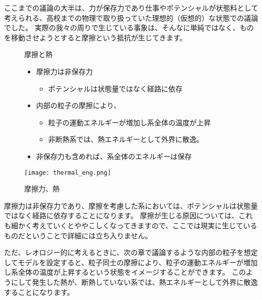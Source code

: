 \documentclass[uplatex,dvipdfmx,a4paper,11pt]{jsarticle}
\begin{document}
ここまでの議論の大半は、力が保存力であり仕事やポテンシャルが状態料として考えられる、高校までの物理で取り扱っていた理想的（仮想的）な状態での議論でした。
実際の我々の周りで生じている事象は、そんなに単純ではなく、ものを移動させようとすると摩擦という抵抗が生じてきます。
\begin{figure}[htb]
	\begin{center}
		\begin{minipage}{0.45\textwidth}
			\large
			\begin{itembox}[l]{摩擦と熱}
				\begin{itemize}
					\item 摩擦力は非保存力
						\begin{itemize}
							\item ポテンシャルは状態量ではなく経路に依存
						\end{itemize}
					\item 内部の粒子の摩擦により、
						\begin{itemize}
							\item 粒子の運動エネルギーが増加し系全体の温度が上昇
							\item 非断熱系では、熱エネルギーとして外界に散逸。
						\end{itemize}
					\item 非保存力も含めれば、系全体のエネルギーは保存
				\end{itemize}
			\end{itembox}
		\end{minipage}
		\begin{minipage}{0.45\textwidth}
			\begin{center}
			\texttt{[image: thermal\_eng.png]}
			\end{center}
		\end{minipage}
		\caption{摩擦力、熱}
		\label{fig:masatsu_netsu}
	\end{center}
\end{figure}

摩擦力は非保存力であり、摩擦を考慮した系においては、ポテンシャルは状態量ではなく経路に依存することになります。
摩擦が生じる原因については、これも細かく考えていくとややこしくなってきますので、ここでは現実に生じているものだということで詳細には立ち入りません。

ただ、レオロジー的に考えるときに、次の章で議論するような内部の粒子を想定してモデルを設定すると、粒子同士の摩擦により、粒子の運動エネルギーが増加し系全体の温度が上昇するという状態をイメージすることができます。
このようにして発生した熱が、断熱していない系では、熱エネルギーとして外界に散逸することになります。
\end{document}
